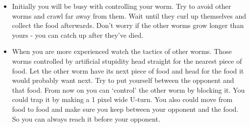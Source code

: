 \begin{itemize}

\item Initially you will be busy with controlling your worm. Try to
avoid other worms and crawl far away from them. Wait until they curl up
themselves and collect the food afterwards. Don't worry if the other
worms grow longer than yours {}- you can catch up after they've died.

\item When you are more experienced watch the tactics of other worms.
Those worms controlled by artificial stupidity head straight for the
nearest piece of food. Let the other worm have its next piece of food
and head for the food it would probably want next. Try to put yourself
between the opponent and that food. From now on you can `control' the
other worm by blocking it. You could trap it by making a 1 pixel wide
U{}-turn. You also could move from food to food and make sure you keep
between your opponent and the food. So you can always reach it before
your opponent.

\end{itemize}
